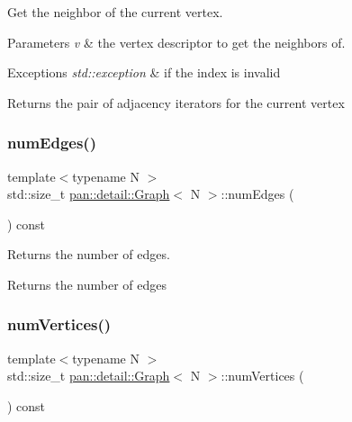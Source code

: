 Get the neighbor of the current vertex. 
\begin{DoxyParams}{Parameters}
{\em v} & the vertex descriptor to get the neighbors of. \\
\hline
\end{DoxyParams}

\begin{DoxyExceptions}{Exceptions}
{\em std\+::exception} & if the index is invalid \\
\hline
\end{DoxyExceptions}
\begin{DoxyReturn}{Returns}
the pair of adjacency iterators for the current vertex 
\end{DoxyReturn}
\mbox{\label{classpan_1_1detail_1_1_graph_a0be37954bf6f8c814b3e9ba7b1727995}} 
\subsubsection{\texorpdfstring{num\+Edges()}{numEdges()}}
{\footnotesize\ttfamily template$<$typename N $>$ \\
std\+::size\+\_\+t \hyperlink{classpan_1_1detail_1_1_graph}{pan\+::detail\+::\+Graph}$<$ N $>$\+::num\+Edges (\begin{DoxyParamCaption}{ }\end{DoxyParamCaption}) const\hspace{0.3cm}{\ttfamily [inline]}}

Returns the number of edges. \begin{DoxyReturn}{Returns}
the number of edges 
\end{DoxyReturn}
\mbox{\label{classpan_1_1detail_1_1_graph_acf43df485b16aa0eb0f22f1ce30dffaf}} 
\subsubsection{\texorpdfstring{num\+Vertices()}{numVertices()}}
{\footnotesize\ttfamily template$<$typename N $>$ \\
std\+::size\+\_\+t \hyperlink{classpan_1_1detail_1_1_graph}{pan\+::detail\+::\+Graph}$<$ N $>$\+::num\+Vertices (\begin{DoxyParamCaption}{ }\end{DoxyParamCaption}) const\hspace{0.3cm}{\ttfamily [inline]}}

